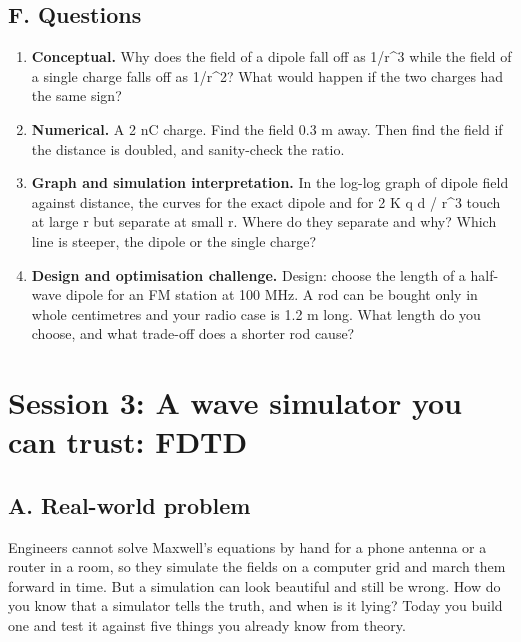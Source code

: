 \documentclass[11pt,a4paper]{article}
\begin{document}
\subsection*{F. Questions}
\begin{enumerate}[nosep]
\item \textbf{Conceptual.} Why does the field of a dipole fall off as 1/r\textasciicircum{}3 while the field of a single charge falls off as 1/r\textasciicircum{}2? What would happen if the two charges had the same sign?
\item \textbf{Numerical.} A 2 nC charge. Find the field 0.3 m away. Then find the field if the distance is doubled, and sanity-check the ratio.
\item \textbf{Graph and simulation interpretation.} In the log-log graph of dipole field against distance, the curves for the exact dipole and for 2 K q d / r\textasciicircum{}3 touch at large r but separate at small r. Where do they separate and why? Which line is steeper, the dipole or the single charge?
\item \textbf{Design and optimisation challenge.} Design: choose the length of a half-wave dipole for an FM station at 100 MHz. A rod can be bought only in whole centimetres and your radio case is 1.2 m long. What length do you choose, and what trade-off does a shorter rod cause?
\end{enumerate}

\section{Session 3: A wave simulator you can trust: FDTD}

\subsection*{A. Real-world problem}
Engineers cannot solve Maxwell's equations by hand for a phone antenna or a router in a room, so they simulate the fields on a computer grid and march them forward in time. But a simulation can look beautiful and still be wrong. How do you know that a simulator tells the truth, and when is it lying? Today you build one and test it against five things you already know from theory.
\end{document}
